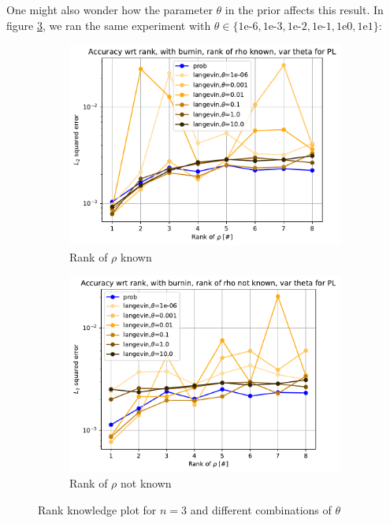 \documentclass[12pt]{memoir}
\begin{document}
One might also wonder how the parameter $\theta$ in the prior affects this result. In figure \ref{fig:rank-info-var-theta}, we ran the same experiment with $\theta \in \{1\text{e-}6,1\text{e-}3,1\text{e-}2,1\text{e-}1,1\text{e}0, 1\text{e}1\}$:

\begin{figure}[H]
    \centering
    \begin{subfigure}[b]{0.49\textwidth}
        \centering
        \includegraphics[width=\textwidth]{figures/experiments/rank_info/rank_known_var_theta_pl-1.png}
        \caption{Rank of $\rho$ known}
        \label{fig:rank-info-var-theta-sub}
    \end{subfigure}
    \hfill
    \begin{subfigure}[b]{0.49\textwidth}
        \centering
        \includegraphics[width=\textwidth]{figures/experiments/rank_info/rank_not_known_var_theta_pl-1.png}
        \caption{Rank of $\rho$ not known}
        \label{fig:rank-no-info-var-theta-sub}
    \end{subfigure}
    \caption{Rank knowledge plot for $n=3$ and different combinations of $\theta$}
    \label{fig:rank-info-var-theta}
\end{figure}
\end{document}

